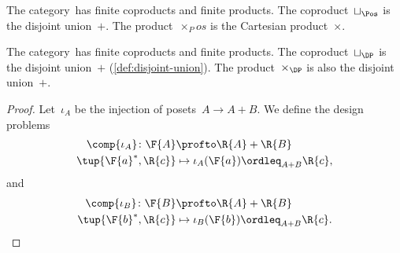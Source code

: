 \begin{example}
    The category~\Pos has finite coproducts and finite products.
    The coproduct~$\sqcup_\Pos$ is the disjoint union~$+$.
    The product~$\times_Pos$ is the Cartesian product~$\times$.
\end{example}

\begin{lemma}
    The category~\DP has finite coproducts and finite products.
    The coproduct~$\sqcup_\DP$ is the disjoint union~$+$ (\cref{def:disjoint-union}).
    The product~$\times_\DP$ is also the disjoint union~$+$.
\end{lemma}

\begin{proof}
    Let~$\iota_A$ be the injection of posets~$A \to A+B$. We define the design problems
    \begin{equation}
        \begin{aligned}
            \comp{\iota_A} \colon \F{A} &\profto \R{A} + \R{B}\\
            \tup{\F{a}^*,\R{c}} &\mapsto \iota_A(\F{a})\ordleq_{A+B}\R{c},
        \end{aligned}
    \end{equation}
    and
    \begin{equation}
        \begin{aligned}
            \comp{\iota_B} \colon \F{B} &\profto \R{A} + \R{B}\\
            \tup{\F{b}^*,\R{c}} &\mapsto \iota_B(\F{b})\ordleq_{A+B}\R{c}.
        \end{aligned}
    \end{equation}


\end{proof}
